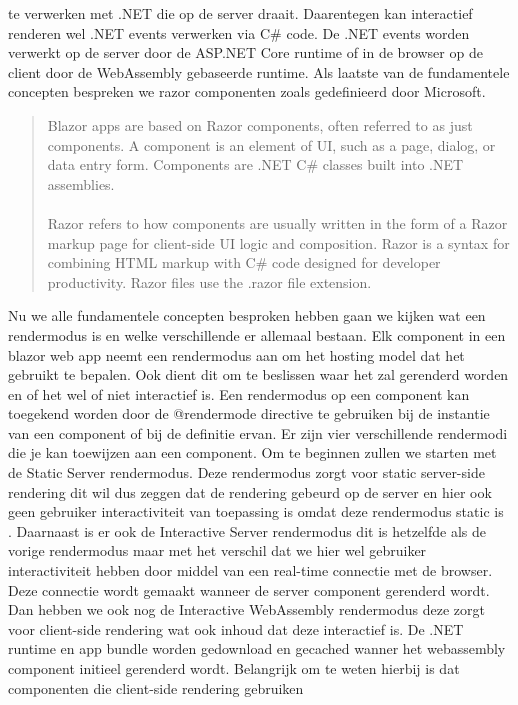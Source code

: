 \documentclass{hogent-article}
\begin{document}
te verwerken met .NET die op de server draait. \autocite{Guardrex2023} Daarentegen kan interactief renderen wel .NET events verwerken via C\# code. De .NET events worden verwerkt op de server door de ASP.NET Core
runtime of in de browser op de client door de WebAssembly gebaseerde runtime. \autocite{Guardrex2023} Als laatste van de fundamentele concepten bespreken we razor componenten zoals gedefinieerd door Microsoft.
\begin{quote}
  Blazor apps are based on Razor components, often referred to as just components. A component is an element of UI, such as a page, dialog, or data entry form. Components are .NET C\# classes built into .NET assemblies.
  \paragraph{}
  Razor refers to how components are usually written in the form of a Razor markup page for client-side UI logic and composition. Razor is a syntax for combining HTML markup with C\# code designed for developer productivity. Razor files use the .razor file extension. \autocite{Guardrex2023}
\end{quote}
Nu we alle fundamentele concepten besproken hebben gaan we kijken wat een rendermodus is en welke verschillende er allemaal bestaan. Elk component in een blazor web app neemt een rendermodus aan om het hosting model
dat het gebruikt te bepalen. Ook dient dit om te beslissen waar het zal gerenderd worden en of het wel of niet interactief is. \autocite{Guardrex2023a} Een rendermodus op een component kan toegekend worden door de
@rendermode directive te gebruiken bij de instantie van een component of bij de definitie ervan. \autocite{Guardrex2023a} Er zijn vier verschillende rendermodi die je kan toewijzen aan een component. Om te beginnen zullen we starten met de
Static Server rendermodus. Deze rendermodus zorgt voor static server-side rendering dit wil dus zeggen dat de rendering gebeurd op de server en hier ook geen gebruiker interactiviteit van toepassing is omdat deze rendermodus
static is \autocite{Guardrex2023a}. Daarnaast is er ook de Interactive Server rendermodus dit is hetzelfde als de vorige rendermodus maar met het verschil dat we hier wel gebruiker interactiviteit hebben door middel van een real-time connectie
met de browser. Deze connectie wordt gemaakt wanneer de server component gerenderd wordt. \autocite{Guardrex2023a} Dan hebben we ook nog de Interactive WebAssembly rendermodus deze zorgt voor client-side rendering wat ook inhoud dat deze
interactief is. De .NET runtime en app bundle worden gedownload en gecached wanner het webassembly component initieel gerenderd wordt. Belangrijk om te weten hierbij is dat componenten die client-side rendering gebruiken
\end{document}

